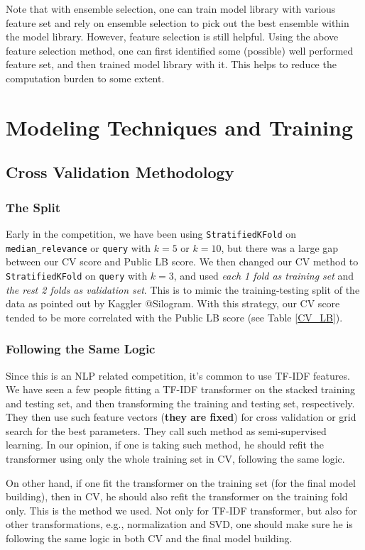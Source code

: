 \documentclass[12pt]{article}
\begin{document}
Note that with ensemble selection, one can train model library with various feature set and rely on ensemble selection to pick out the best ensemble within the model library. However, feature selection is still helpful. Using the above feature selection method, one can first identified some (possible) well performed feature set, and then trained model library with it. This helps to reduce the computation burden to some extent.

\section{Modeling Techniques and Training}
\subsection{Cross Validation Methodology}
\subsubsection{The Split}
Early in the competition, we have been using \texttt{StratifiedKFold} on \texttt{median\_relevance} or \texttt{query} with $k = 5$ or $k = 10$, but there was a large gap between our CV score and Public LB score. We then changed our CV method to \texttt{StratifiedKFold} on \texttt{query} with $k = 3$, and used \emph{each 1 fold as training set} and \emph{the rest 2 folds as validation set}. This is to mimic the training-testing split of the data as pointed out by Kaggler @Silogram. With this strategy, our CV score tended to be more correlated with the Public LB score (see Table \ref{CV_LB}).
\subsubsection{Following the Same Logic}
Since this is an NLP related competition, it's common to use TF-IDF features. We have seen a few people fitting a TF-IDF transformer on the stacked training and testing set, and then transforming the training and testing set, respectively. They then use such feature vectors (\textbf{they are fixed}) for cross validation or grid search for the best parameters. They call such method as semi-supervised learning. In our opinion, if one is taking such method, he should refit the transformer using only the whole training set in CV, following the same logic.

On other hand, if one fit the transformer on the training set (for the final model building), then in CV, he should also refit the transformer on the training fold only. This is the method we used. Not only for TF-IDF transformer, but also for other transformations, e.g., normalization and SVD, one should make sure he is following the same logic in both CV and the final model building.
\end{document}
